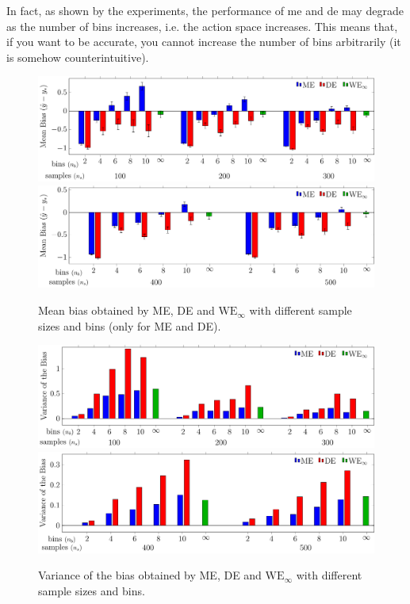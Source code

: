In fact, as shown by the experiments, the performance of \gls{me} and \gls{de} may degrade as the number of bins increases, i.e. the action space increases.
This means that, if you want to be accurate, you cannot increase the number of bins arbitrarily (it is somehow counterintuitive).
\begin{figure}
 \begin{minipage}{.99\columnwidth}
 \centering
  \includegraphics[width=\textwidth]{./img/MM_123_new_noabs.pdf}\\
  \includegraphics[width=\textwidth]{./img/MM_45_new_noabs.pdf}
 \end{minipage}
  \caption{Mean bias obtained by ME, DE and $\text{WE}_{\infty}$ with different sample sizes  and bins (only for ME and DE).
  }
  \label{F:pricing_bias}
\end{figure}
\begin{figure}[t]
 \begin{minipage}{.99\columnwidth}
 \centering
  \includegraphics[width=\textwidth]{./img/MM_123_new_var.pdf}\\
  \includegraphics[width=\textwidth]{./img/MM_45_new_var.pdf}
 \end{minipage}
  \caption{Variance of the bias obtained by ME, DE and $\text{WE}_{\infty}$ with different sample sizes and bins.
  }
  \label{F:pricing_variance}
\end{figure}
